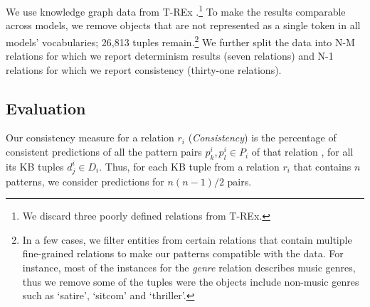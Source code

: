 We use knowledge graph data from T-REx \cite{trex}.\footnote{We discard three poorly defined relations from T-REx.} To make the results comparable across models, we remove objects that are not represented as a single token in all models'
vocabularies; 26,813 tuples remain.\footnote{In a few cases, we filter entities from certain relations that contain multiple fine-grained relations to make our patterns compatible with the data. For instance, most of the instances for the \textit{genre} relation describes music genres, thus we remove some of the tuples were the objects include non-music genres such as `satire', `sitcom' and `thriller'.}
We further split the data into N-M relations for which we
report  determinism results (seven relations) and N-1
relations for which we report consistency (thirty-one relations). 


\subsection{Evaluation}
\label{sec:eval}


Our consistency measure for a relation $r_i$ (\textit{Consistency}) is the
percentage of consistent predictions of all the pattern pairs
$p_k^i,p_l^i \in P_i$ of that relation , for all its KB tuples
$d^i_j \in D_i$. Thus, for each KB tuple from a relation
$r_i$ that contains $n$ patterns, we consider predictions
for $n(n-1)/2$ pairs.

